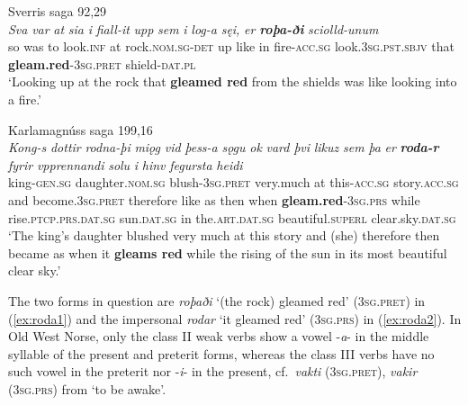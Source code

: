 \documentclass[output=paper,colorlinks,citecolor=brown]{langscibook}
\begin{document}
 
\begin{exe}
    \ex Sverris saga 92,29 \label{ex:roda1}\\
    \gll \textit{Sva} \textit{var} \textit{at} \textit{sia} \textit{i} \textit{fiall-it} \textit{upp} \textit{sem} \textit{i} \textit{log-a} \textit{sęi,} \textit{er} {\textit{\textbf{roþa-ði}} } \textit{sciolld-unum}\\
      so was to look.\textsc{inf} at rock.\textsc{nom.sg-det} up like  in fire-\textsc{acc.sg} look.\textsc{3sg.pst.sbjv} that \textbf{gleam.red}-\textsc{3sg.pret} shield-\textsc{dat.pl}\\
    \glt   ‘Looking up at the rock that \textbf{gleamed red} from the shields was like looking into a fire.’

    \ex Karlamagnúss saga 199,16 \label{ex:roda2}\\
     \textit{Kong-s} \textit{dottir} {\textit{rodna-þi} } \textit{miǫg} \textit{vid} \textit{þess-a} \textit{sǫgu} \textit{ok} \textit{vard} \textit{þvi} \textit{likuz} \textit{sem} \textit{þa} \textit{er} {\textit{\textbf{roda-r}} } \textit{fyrir} \textit{vpprennandi} \textit{solu} \textit{i} \textit{hinv} \textit{fegursta} \textit{heidi}\\
    {} king-\textsc{gen.sg} daughter.\textsc{nom.sg} blush-\textsc{3sg.pret} {very.much} at this-\textsc{acc.sg} story.\textsc{acc.sg} and become.\textsc{3sg.pret} therefore like as then when \textbf{gleam.red}-\textsc{3sg.prs} while rise.\textsc{ptcp.prs.dat.sg} sun.\textsc{dat.sg} in the.\textsc{art.dat.sg} beautiful.\textsc{superl} clear.sky.\textsc{dat.sg}\\
    \glt ‘The king's daughter blushed very much at this story and (she) therefore then became as when it \textbf{gleams red} while the rising of the sun in its most beautiful clear sky.’
\end{exe} 

The two forms in question are \textit{roþaði}  ‘(the rock) gleamed red’ (\textsc{3sg.pret}) in (\ref{ex:roda1}) and the impersonal \textit{rodar}  ‘it gleamed red’ (\textsc{3sg.prs}) in (\ref{ex:roda2}). In Old West Norse, only the class II weak verbs show a vowel -\textit{a}- in the middle syllable of the present and preterit forms, whereas the class III verbs have no such vowel in the preterit nor -\textit{i}- in the present, cf.\ \textit{vakti} (\textsc{3sg.pret}), \textit{vakir} (\textsc{3sg.prs}) from  ‘to be awake’.
\end{document}
